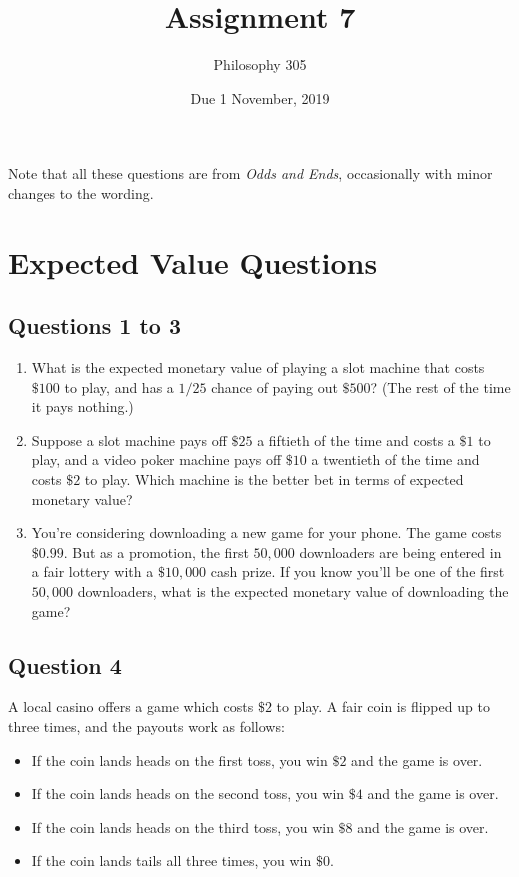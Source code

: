 \documentclass[11pt,]{article}
\title{Assignment 7}
\author{Philosophy 305}
\date{Due 1 November, 2019}
\providecommand{\tightlist}{%
  \setlength{\itemsep}{0pt}\setlength{\parskip}{0pt}}
\begin{document}
\maketitle

Note that all these questions are from \emph{Odds and Ends},
occasionally with minor changes to the wording.

\hypertarget{expected-value-questions}{%
\section{Expected Value Questions}\label{expected-value-questions}}

\hypertarget{questions-1-to-3}{%
\subsection{Questions 1 to 3}\label{questions-1-to-3}}

\begin{enumerate}
\def\labelenumi{\arabic{enumi}.}
\tightlist
\item
  What is the expected monetary value of playing a slot machine that
  costs \(\$100\) to play, and has a \(1/25\) chance of paying out
  \(\$500\)? (The rest of the time it pays nothing.)
\item
  Suppose a slot machine pays off \(\$25\) a fiftieth of the time and
  costs a \(\$1\) to play, and a video poker machine pays off \(\$10\) a
  twentieth of the time and costs \(\$2\) to play. Which machine is the
  better bet in terms of expected monetary value?
\item
  You're considering downloading a new game for your phone. The game
  costs \(\$0.99\). But as a promotion, the first \(50,000\) downloaders
  are being entered in a fair lottery with a \(\$10,000\) cash prize. If
  you know you'll be one of the first \(50,000\) downloaders, what is
  the expected monetary value of downloading the game?
\end{enumerate}

\hypertarget{question-4}{%
\subsection{Question 4}\label{question-4}}

A local casino offers a game which costs \(\$2\) to play. A fair coin is
flipped up to three times, and the payouts work as follows:

\begin{itemize}
\tightlist
\item
  If the coin lands heads on the first toss, you win \(\$2\) and the
  game is over.
\item
  If the coin lands heads on the second toss, you win \(\$4\) and the
  game is over.
\item
  If the coin lands heads on the third toss, you win \(\$8\) and the
  game is over.
\item
  If the coin lands tails all three times, you win \(\$0\).
\end{itemize}
\end{document}
